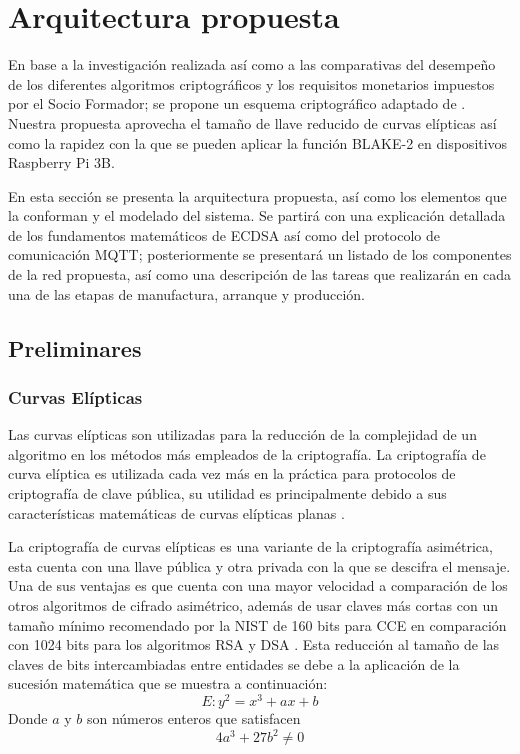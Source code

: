 \documentclass{article}
\begin{document}
    \section{Arquitectura propuesta} \label{sec:architecture}

        En base a la investigación realizada así como a las comparativas del desempeño de los diferentes algoritmos criptográficos y los requisitos monetarios impuestos por el Socio Formador; se propone un esquema criptográfico adaptado de \cite{lohachab2019ecc}. Nuestra propuesta aprovecha el tamaño de llave reducido de curvas elípticas así como la rapidez con la que se pueden aplicar la función BLAKE-2 en dispositivos Raspberry Pi 3B.

        En esta sección se presenta la arquitectura propuesta, así como los elementos que la conforman y el modelado del sistema. Se partirá con una explicación detallada de los fundamentos matemáticos de ECDSA así como del protocolo de comunicación MQTT; posteriormente se presentará un listado de los componentes de la red propuesta, así como una descripción de las tareas que realizarán en cada una de las etapas de manufactura, arranque y producción.

        \subsection{Preliminares}

            \subsubsection{Curvas Elípticas}

                Las curvas elípticas son utilizadas para la reducción de la complejidad de un algoritmo en los métodos más empleados de la criptografía. La criptografía de curva elíptica es utilizada cada vez más en la práctica para protocolos de criptografía de clave pública, su utilidad es principalmente debido a sus características matemáticas de curvas elípticas planas \cite{sanchez2021solucion}.

                La criptografía de curvas elípticas es una variante de la criptografía asimétrica, esta cuenta con una llave pública y otra privada con la que se descifra el mensaje. Una de sus ventajas es que cuenta con una mayor velocidad a comparación de los otros algoritmos de cifrado asimétrico, además de usar claves más cortas con un tamaño mínimo recomendado por la NIST de 160 bits para CCE en comparación con 1024 bits para los algoritmos RSA y DSA \cite{ramirez2018sistemas}. Esta reducción al tamaño de las claves de bits intercambiadas entre entidades se debe a la aplicación de la sucesión matemática que se muestra a continuación:
                \begin{equation}
                    E:y^2=x^3 + ax + b
                \end{equation}
                Donde $a$ y $b$ son números enteros que satisfacen
                \begin{equation}
                    4a^3 + 27b^2 \neq 0
                \end{equation}
\end{document}
